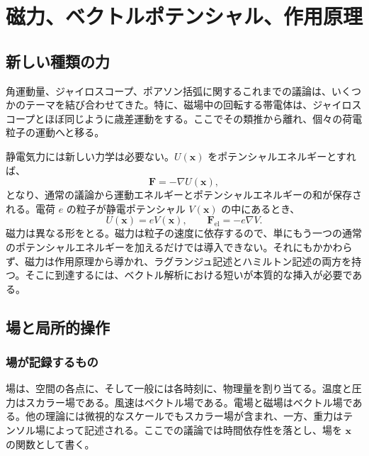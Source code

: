 \chapter{磁力、ベクトルポテンシャル、作用原理}


\section{新しい種類の力}

角運動量、ジャイロスコープ、ポアソン括弧に関するこれまでの議論は、いくつかのテーマを結び合わせてきた。特に、磁場中の回転する帯電体は、ジャイロスコープとほぼ同じように歳差運動をする。ここでその類推から離れ、個々の荷電粒子の運動へと移る。

静電気力には新しい力学は必要ない。\(U(\mathbf x)\) をポテンシャルエネルギーとすれば、
\begin{equation}
  \mathbf F=-\nabla U(\mathbf x),
\end{equation}
となり、通常の議論から運動エネルギーとポテンシャルエネルギーの和が保存される。電荷 \(e\) の粒子が静電ポテンシャル \(V(\mathbf x)\) の中にあるとき、
\begin{equation}
  U(\mathbf x)=eV(\mathbf x),
  \qquad
  \mathbf F_{\mathrm{el}}=-e\nabla V.
\end{equation}
磁力は異なる形をとる。磁力は粒子の速度に依存するので、単にもう一つの通常のポテンシャルエネルギーを加えるだけでは導入できない。それにもかかわらず、磁力は作用原理から導かれ、ラグランジュ記述とハミルトン記述の両方を持つ。そこに到達するには、ベクトル解析における短いが本質的な挿入が必要である。

\section{場と局所的操作}

\subsection{場が記録するもの}

場は、空間の各点に、そして一般には各時刻に、物理量を割り当てる。温度と圧力はスカラー場である。風速はベクトル場である。電場と磁場はベクトル場である。他の理論には微視的なスケールでもスカラー場が含まれ、一方、重力はテンソル場によって記述される。ここでの議論では時間依存性を落とし、場を \(\mathbf x\) の関数として書く。

